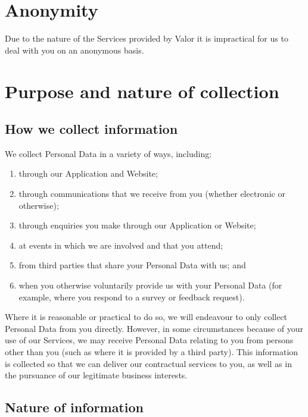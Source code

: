 \documentclass[10pt]{article}
\begin{document}
\section{Anonymity}
Due to the nature of the Services provided by Valor it is impractical for us to deal with you on an anonymous basis.


\section{Purpose and nature of collection}
\subsection{How we collect information}
We collect Personal Data in a variety of ways, including:
\begin{enumerate}[(1)]
	\item through our Application and Website;

	\item through communications that we receive from you (whether electronic or otherwise);

	\item through enquiries you make through our Application or Website;

	\item at events in which we are involved and that you attend;

	\item from third parties that share your Personal Data with us; and

	\item when you otherwise voluntarily provide us with your Personal Data (for example, where you respond to a survey or feedback request).
\end{enumerate}

Where it is reasonable or practical to do so, we will endeavour to only collect Personal Data from you directly. However, in some circumstances because of your use of our Services, we may receive Personal Data relating to you from persons other than you (such as where it is provided by a third party). This information is collected so that we can deliver our contractual services to you, as well as in the pursuance of our legitimate business interests.

\subsection{Nature of information}
\end{document}

